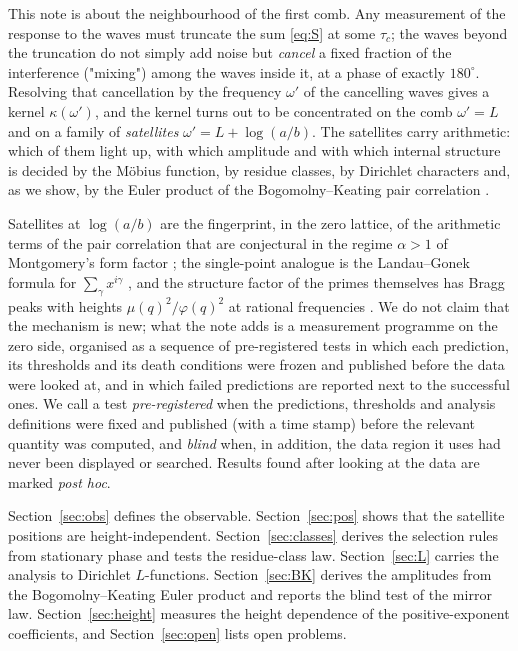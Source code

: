 \documentclass[12pt]{amsart}
\begin{document}
This note is about the neighbourhood of the first comb. Any measurement
of the response to the waves must truncate the sum \eqref{eq:S} at some
$\tau_c$; the waves beyond the truncation do not simply add noise but
\emph{cancel} a fixed fraction of the interference ("mixing") among the
waves inside it, at a phase of exactly $180^\circ$. Resolving that
cancellation by the frequency $\omega'$ of the cancelling waves gives a
kernel $\kappa(\omega')$, and the kernel turns out to be concentrated on
the comb $\omega' = L$ and on a family of \emph{satellites}
$\omega' = L + \log(a/b)$. The satellites carry arithmetic: which of them
light up, with which amplitude and with which internal structure is
decided by the M\"obius function, by residue classes, by Dirichlet
characters and, as we show, by the Euler product of the
Bogomolny--Keating pair correlation \cite{BK95,BK96,Bog07,CS07}.

Satellites at $\log(a/b)$ are the fingerprint, in the zero lattice, of
the arithmetic terms of the pair correlation that are conjectural in the
regime $\alpha > 1$ of Montgomery's form factor \cite{Mont73,Rod13}; the
single-point analogue is the Landau--Gonek formula for
$\sum_\gamma x^{i\gamma}$ \cite{Landau12,Gonek93,Fujii89,DHPC26}, and
the structure factor of the primes themselves has Bragg peaks with
heights $\mu(q)^2/\varphi(q)^2$ at rational frequencies
\cite{ZMT18,TZdCI18}. We do not claim that the mechanism is new; what the
note adds is a measurement programme on the zero side, organised as a
sequence of pre-registered tests in which each prediction, its
thresholds and its death conditions were frozen and published before the
data were looked at, and in which failed predictions are reported next to
the successful ones. We call a test \emph{pre-registered} when the
predictions, thresholds and analysis definitions were fixed and published
(with a time stamp) before the relevant quantity was computed, and
\emph{blind} when, in addition, the data region it uses had never been
displayed or searched. Results found after looking at the data are marked
\emph{post hoc}.

Section~\ref{sec:obs} defines the observable. Section~\ref{sec:pos}
shows that the satellite positions are height-independent.
Section~\ref{sec:classes} derives the selection rules from stationary
phase and tests the residue-class law. Section~\ref{sec:L} carries the
analysis to Dirichlet $L$-functions. Section~\ref{sec:BK} derives the
amplitudes from the Bogomolny--Keating Euler product and reports the
blind test of the mirror law. Section~\ref{sec:height} measures the
height dependence of the positive-exponent coefficients, and
Section~\ref{sec:open} lists open problems.
\end{document}
